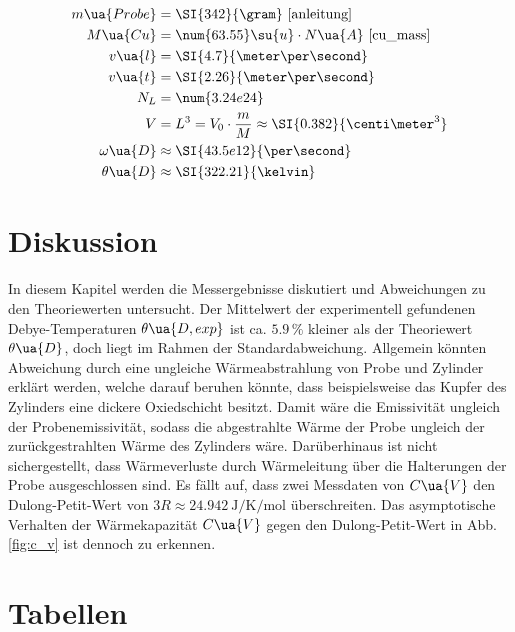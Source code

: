 \begin{align*}
  m\ua{Probe} &= \SI{342}{\gram} \text{~\cite{anleitung}}\\
  M\ua{Cu} &= \num{63.55}\su{u}\cdot N\ua{A} \text{~\cite{cu_mass}}\\
  v\ua{l} &= \SI{4.7}{\meter\per\second}\\
  v\ua{t} &= \SI{2.26}{\meter\per\second}\\
  N_L &= \num{3.24e24} \\
  V &= L^3 = V_0\cdot\frac{m}{M}\approx \SI{0.382}{\centi\meter^3}\\
  \omega\ua{D} &\approx \SI{43.5e12}{\per\second}\\
  \theta\ua{D} &\approx \SI{322.21}{\kelvin}
\end{align*}

\section{Diskussion}
\label{sec:diskussion}

In diesem Kapitel werden die Messergebnisse diskutiert und Abweichungen zu den Theoriewerten untersucht.
Der Mittelwert der experimentell gefundenen Debye-Temperaturen $\theta\ua{D, exp}$ ist ca.
$\num{5.9}\,\%$ kleiner als der Theoriewert $\theta\ua{D}$, doch liegt im Rahmen der
Standardabweichung.
Allgemein könnten Abweichung durch eine ungleiche Wärmeabstrahlung von Probe und Zylinder
erklärt werden, welche darauf beruhen könnte, dass beispielsweise das Kupfer
des Zylinders eine dickere Oxiedschicht besitzt. Damit wäre die Emissivität ungleich
der Probenemissivität, sodass die abgestrahlte Wärme der Probe ungleich der
zurückgestrahlten Wärme des Zylinders wäre.
Darüberhinaus ist nicht sichergestellt, dass Wärmeverluste durch
Wärmeleitung über die Halterungen der Probe ausgeschlossen sind.
Es fällt auf, dass zwei Messdaten von $C\ua{V}$ den Dulong-Petit-Wert von
$3R \approx \SI{24.942}{\joule\per\kelvin\per\mol}$ überschreiten.
Das asymptotische Verhalten der Wärmekapazität $C\ua{V}$ gegen den
Dulong-Petit-Wert in Abb. \ref{fig:c_v} ist dennoch zu erkennen.

\newpage
\pagestyle{empty}
\section{Tabellen}
\label{sec:tabellen}


